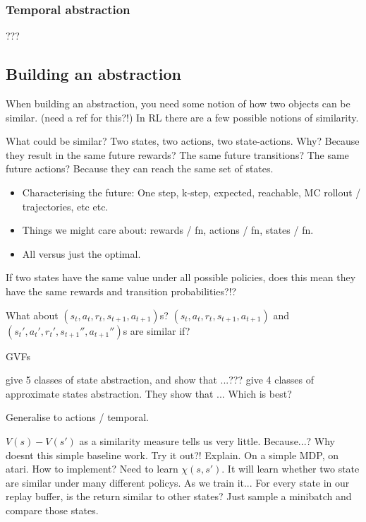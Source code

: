 \subsubsection{Temporal abstraction}

???


\subsection{Building an abstraction}


When building an abstraction, you need some notion of how two objects can be similar. (need a ref for this?!)
In RL there are a few possible notions of similarity.

What could be similar? Two states, two actions, two state-actions. Why?
Because they result in the same future rewards? The same future transitions? The same future actions?
Because they can reach the same set of states.

\begin{itemize}
  \tightlist
  \item Characterising the future: One step, k-step, expected, reachable, MC rollout / trajectories, etc etc.
  \item Things we might care about: rewards / fn, actions / fn, states / fn.
  \item All versus just the optimal.
\end{itemize}

If two states have the same value under all possible policies, does this mean
they have the same rewards and transition probabilities?!?

What about $(s_t, a_t, r_t, s_{t+1}, a_{t+1})$s? $(s_t, a_t, r_t, s_{t+1}, a_{t+1})$ and $(s_t', a_t', r_t', s_{t+1}'', a_{t+1}'')$s are similar if?

GVFs

\cite{Littman2006} give 5 classes of state abstraction, and show that ...???
\cite{Abel2017} give 4 classes of approximate states abstraction. They show that ...
Which is best?

Generalise to actions / temporal.

$V(s) - V(s')$ as a similarity measure tells us very little. Because...?
Why doesnt this simple baseline work. Try it out?! Explain.
On a simple MDP, on atari. How to implement? Need to learn $\chi(s, s')$.
It will learn whether two state are similar under many different policys. As we train it...
For every state in our replay buffer, is the return similar to other states?
Just sample a minibatch and compare those states.

